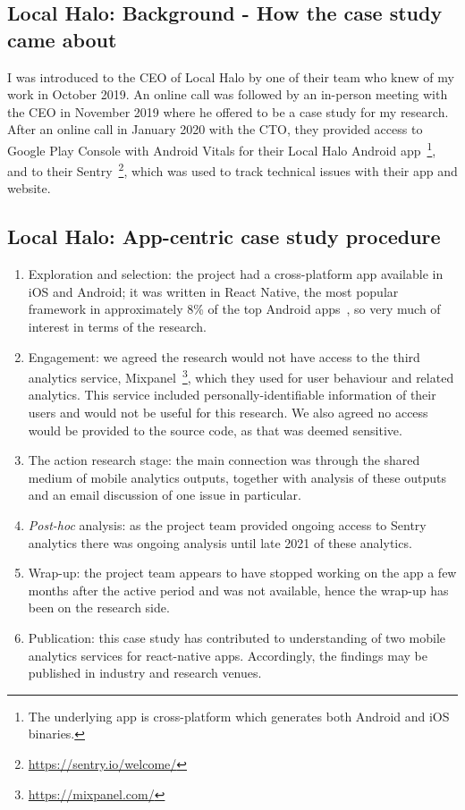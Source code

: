 \subsection{Local Halo: Background - How the case study came about}
I was introduced to the CEO of Local Halo by one of their team who knew of my work in October 2019. An online call was followed by an in-person meeting with the CEO in November 2019 where he offered to be a case study for my research. After an online call in January 2020 with the CTO, they provided access to Google Play Console with Android Vitals for their Local Halo Android app~\footnote{The underlying app is cross-platform which generates both Android and iOS binaries.}, and to their Sentry~\footnote{\url{https://sentry.io/welcome/}}, which was used to track technical issues with their app and website. 

\subsection{Local Halo: App-centric case study procedure}
{\small
\begin{enumerate}
    \itemsep0em
    \item Exploration and selection: the project had a cross-platform app available in iOS and Android; it was written in React Native, the  most popular framework in approximately 8\% of the top Android apps~\citep{appbrain2021_react_native_stats}, so very much of interest in terms of the research.
    \item Engagement: we agreed the research would not have access to the third analytics service, Mixpanel~\footnote{\url{https://mixpanel.com/}}, which they used for user behaviour and related analytics. This service included personally-identifiable information of their users and would not be useful for this research. We also agreed no access would be provided to the source code, as that was deemed sensitive. 
    \item The action research stage: the main connection was through the shared medium of mobile analytics outputs, together with analysis of these outputs and an email discussion of one issue in particular.
    \item \textit{Post-hoc} analysis: as the project team provided ongoing access to Sentry analytics there was ongoing analysis until late 2021 of these analytics. 
    \item Wrap-up: the project team appears to have stopped working on the app a few months after the active period and was not available, hence the wrap-up has been on the research side.
    \item Publication: this case study has contributed to understanding of two mobile analytics services for react-native apps. Accordingly, the findings may be published in industry and research venues.
\end{enumerate}
}


